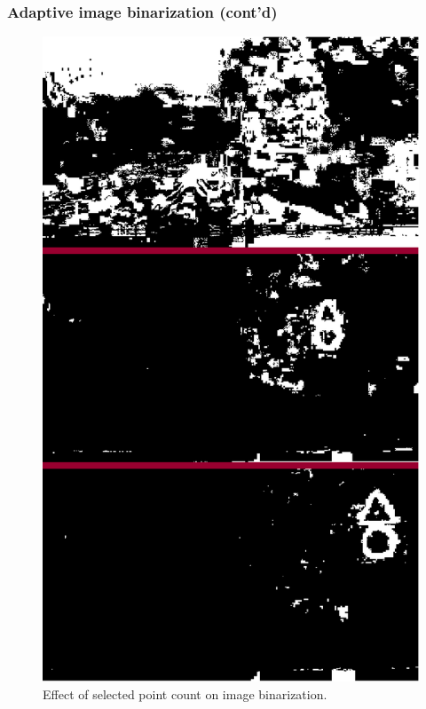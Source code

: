 \documentclass{beamer}
\begin{document}
\frame
{
	\frametitle{Adaptive image binarization (cont'd)}
	\begin{figure}[ht]
	\begin{center}
	\includegraphics[height=.6\paperheight]{../img/adapbright.eps}
	\caption{Effect of selected point count on image binarization.}
	\label{fig:adapbright}
	\end{center}
	\end{figure}
}
\end{document}
